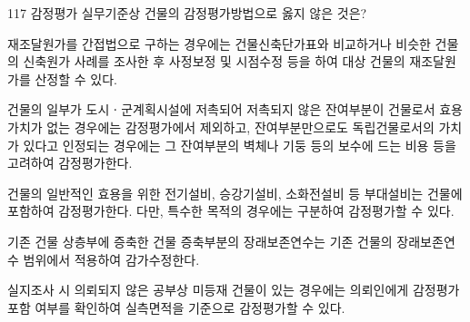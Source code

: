 \begin{question}{117}
감정평가 실무기준상 건물의 감정평가방법으로 옳지 않은 것은?
\begin{choices}
  \item 재조달원가를 간접법으로 구하는 경우에는 건물신축단가표와 비교하거나 비슷한 건물의 신축원가 사례를 조사한 후 사정보정 및 시점수정 등을 하여 대상 건물의 재조달원가를 산정할 수 있다.
  \item 건물의 일부가 도시ㆍ군계획시설에 저촉되어 저촉되지 않은 잔여부분이 건물로서 효용가치가 없는 경우에는 감정평가에서 제외하고, 잔여부분만으로도 독립건물로서의 가치가 있다고 인정되는 경우에는 그 잔여부분의 벽체나 기둥 등의 보수에 드는 비용 등을 고려하여 감정평가한다.
  \item 건물의 일반적인 효용을 위한 전기설비, 승강기설비, 소화전설비 등 부대설비는 건물에 포함하여 감정평가한다. 다만, 특수한 목적의 경우에는 구분하여 감정평가할 수 있다.
  \item 기존 건물 상층부에 증축한 건물 증축부분의 장래보존연수는 기존 건물의 장래보존연수 범위에서 적용하여 감가수정한다.
  \item 실지조사 시 의뢰되지 않은 공부상 미등재 건물이 있는 경우에는 의뢰인에게 감정평가 포함 여부를 확인하여 실측면적을 기준으로 감정평가할 수 있다.
\end{choices}
\end{question}
